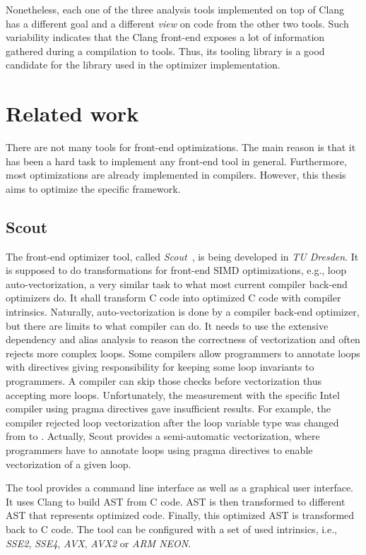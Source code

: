 Nonetheless, each one of the three analysis tools implemented on top of Clang has a different goal and a different \textit{view} on code from the other two tools. Such variability indicates that the Clang front-end exposes a lot of information gathered during a compilation to tools. Thus, its tooling library is a good candidate for the library used in the optimizer implementation.

\section{Related work}
There are not many tools for front-end optimizations. The main reason is that it has been a hard task to implement any front-end tool in general. Furthermore, most optimizations are already implemented in compilers. However, this thesis aims to optimize the specific framework.

\subsection{Scout}
\label{scout}
The front-end optimizer tool, called \emph{Scout}~\cite{scout}, is being developed in \emph{TU Dresden}. It is supposed to do transformations for front-end SIMD optimizations, e.g., loop auto-vectorization, a very similar task to what most current compiler back-end optimizers do. It shall transform C code into optimized C code with compiler intrinsics. Naturally, auto-vectorization is done by a compiler back-end optimizer, but there are limits to what compiler can do. It needs to use the extensive dependency and alias analysis to reason the correctness of vectorization and often rejects more complex loops. Some compilers allow programmers to annotate loops with  directives giving responsibility for keeping some loop invariants to programmers. A compiler can skip those checks before vectorization thus accepting more loops. Unfortunately, the measurement with the specific Intel compiler using pragma directives gave insufficient results. For example, the compiler rejected loop vectorization after the loop variable type was changed from  to . Actually, Scout provides a semi-automatic vectorization, where programmers have to annotate loops using pragma directives to enable vectorization of a given loop. 

The tool provides a command line interface as well as a graphical user interface. It uses Clang to build AST from C code. AST is then transformed to different AST that represents optimized code. Finally, this optimized AST is transformed back to C code. The tool can be configured with a set of used intrinsics, i.e., \emph{SSE2}, \emph{SSE4}, \emph{AVX}, \emph{AVX2} or \emph{ARM NEON}.

